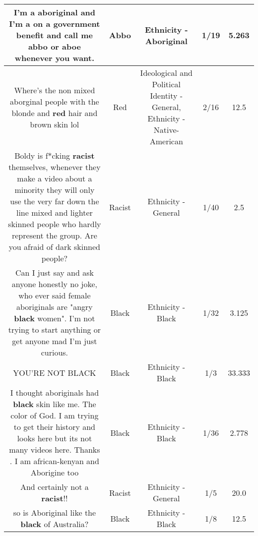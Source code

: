 \documentclass[11pt]{article}
\newlength\mylength
\begin{document}
\begin{center}
\begin{longtable}{|C{.65\mylength}|C{.30\mylength}|C{.12\mylength}|C{.12\mylength}|C{.12\mylength}|}
  \small I'm a aboriginal and I'm a on a government benefit and call me \textbf{abbo} or aboe whenever you want.\normalsize   & Abbo & Ethnicity - Aboriginal & 1/19 & 5.263 \\  \hline
  \small Where's the non mixed aborginal people with the blonde and \textbf{r\textbf{ed}} hair and brown skin lol\normalsize   & Red &  Ideological and Political Identity - General, Ethnicity - Native-American & 2/16 & 12.5 \\  \hline
  \small Boldy is f*cking \textbf{racist} themselves, whenever they make a video about a minority they will only use the very far down the line mixed and lighter skinned people who hardly represent the group. Are you afraid of dark skinned people?\normalsize   & Racist & Ethnicity - General & 1/40 & 2.5 \\  \hline
  \small Can I just say and ask anyone honestly no joke, who ever said female aboriginals are "angry \textbf{black} women". I'm not trying to start anything or get anyone mad I'm just curious.\normalsize   & Black & Ethnicity - Black & 1/32 & 3.125 \\  \hline
  \small YOU'RE NOT BLACK\normalsize   & Black & Ethnicity - Black & 1/3 & 33.333 \\  \hline
  \small I thought aboriginals had \textbf{black} skin like me. The color of God. I am trying to get their history  and looks here but its not many videos here. Thanks . I am african-kenyan and Aborigine too\normalsize   & Black & Ethnicity - Black & 1/36 & 2.778 \\  \hline
  \small And certainly not a \textbf{racist}!!\normalsize   & Racist & Ethnicity - General & 1/5 & 20.0 \\  \hline
  \small so is Aboriginal like the \textbf{black} of Australia?\normalsize   & Black & Ethnicity - Black & 1/8 & 12.5 \\  \hline

\end{longtable}
\end{center}
\end{document}

